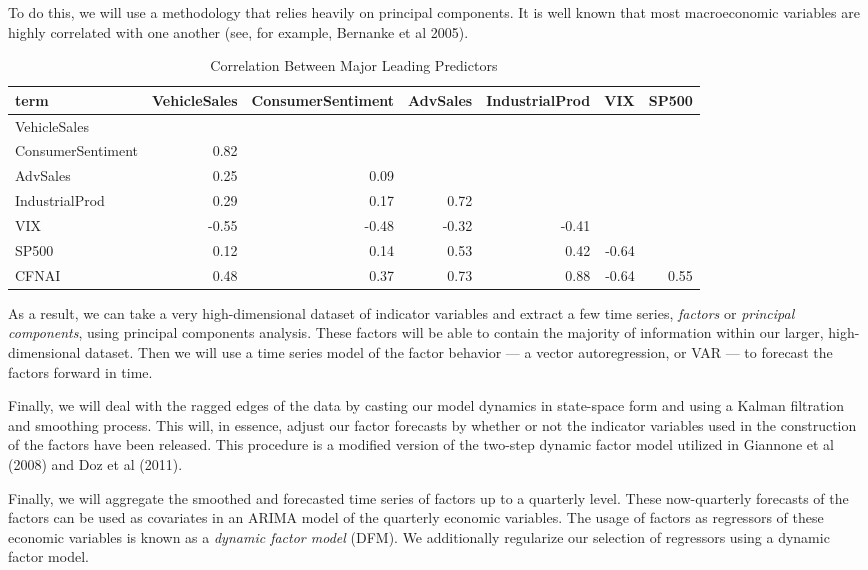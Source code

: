 \documentclass[11pt, letterpaper]{article}\usepackage[]{graphicx}\usepackage[]{color}
\begin{document}
To do this, we will use a methodology that relies heavily on principal components. It is well known that most macroeconomic variables are highly correlated with one another (see, for example, Bernanke et al 2005).
\begin{table}[H]
\centering
\begingroup\scriptsize
\begin{tabular}{lrrrrrr}
  \hline
term & VehicleSales & ConsumerSentiment & AdvSales & IndustrialProd & VIX & SP500 \\ 
  \hline
VehicleSales &  &  &  &  &  &  \\ 
  ConsumerSentiment & 0.82 &  &  &  &  &  \\ 
  AdvSales & 0.25 & 0.09 &  &  &  &  \\ 
  IndustrialProd & 0.29 & 0.17 & 0.72 &  &  &  \\ 
  VIX & -0.55 & -0.48 & -0.32 & -0.41 &  &  \\ 
  SP500 & 0.12 & 0.14 & 0.53 & 0.42 & -0.64 &  \\ 
  CFNAI & 0.48 & 0.37 & 0.73 & 0.88 & -0.64 & 0.55 \\ 
   \hline
\end{tabular}
\endgroup
\caption{Correlation Between Major Leading Predictors} 
\end{table}

As a result, we can take a very high-dimensional dataset of indicator variables and extract a few time series, \textit{factors} or \textit{principal components}, using principal components analysis. These factors will be able to contain the majority of information within our larger, high-dimensional dataset. Then we will use a time series model of the factor behavior --- a vector autoregression, or VAR --- to forecast the factors forward in time. 

Finally, we will deal with the ragged edges of the data by casting our model dynamics in state-space form and using a Kalman filtration and smoothing process. This will, in essence, adjust our factor forecasts by whether or not the indicator variables used in the construction of the factors have been released. This procedure is a modified version of the two-step dynamic factor model utilized in Giannone et al (2008) and Doz et al (2011).

Finally, we will aggregate the smoothed and forecasted time series of factors up to a quarterly level. These now-quarterly forecasts of the factors can be used as covariates in an ARIMA model of the quarterly economic variables. The usage of factors as regressors of these economic variables is known as a \textit{dynamic factor model} (DFM). We additionally regularize our selection of regressors using a dynamic factor model.
\end{document}
